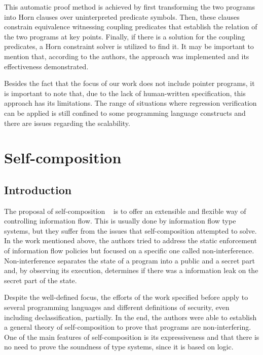 This automatic proof method is achieved by first transforming the two programs into Horn clauses over uninterpreted predicate symbols. 
Then, these clauses constrain equivalence witnessing coupling predicates that establish the relation of the two programs at key points.
Finally, if there is a solution for the coupling predicates, a Horn constraint solver is utilized to find it.
It may be important to mention that, according to the authors, the approach was implemented and its effectiveness demonstrated.

Besides the fact that the focus of our work does not include pointer programs, it is important to note that, due to the lack of human-written specification, this approach has its limitations.
The range of situations where regression verification can be applied is still confined to some programming language constructs and there are issues regarding the scalability.


\section{Self-composition} 
\label{sec:self_composition}

\subsection{Introduction}
\label{subsec:self_composition_intro}

The proposal of self-composition ~\cite{DBLP:conf/csfw/BartheDR04} is to offer an extensible and flexible way of controlling information flow.
This is usually done by information flow type systems, but they suffer from the issues that self-composition attempted to solve.
In the work mentioned above, the authors tried to address the static enforcement of information flow policies but focused on a specific one called non-interference.
Non-interference separates the state of a program into a public and a secret part and, by observing its execution, determines if there was a information leak on the secret part of the state.

Despite the well-defined focus, the efforts of the work specified before apply to several programming languages and different definitions of security, even including declassification, partially.
In the end, the authors were able to establish a general theory of self-composition to prove that programs are non-interfering.
One of the main features of self-composition is its expressiveness and that there is no need to prove the soundness of type systems, since it is based on logic.


